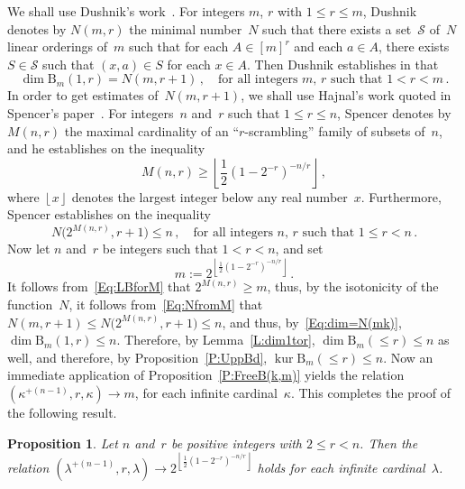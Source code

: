 \documentclass[psamsfonts,reqno]{amsart}
\theoremstyle{plain}
\newtheorem{proposition}[lemma]{Proposition}
\theoremstyle{definition}
\theoremstyle{remark}
\numberwithin{equation}{section}
\numberwithin{figure}{section}
\newcommand{\gk}{\kappa}
\newcommand{\gl}{\lambda}
\newcommand{\les}{\leqslant}
\newcommand{\intgr}[1]{\left\lfloor{#1}\right\rfloor}
\DeclareMathOperator{\kur}{kur}
\newcommand{\cS}{\mathcal{S}}
\newcommand{\rB}{\mathrm{B}}
\begin{document}
We shall use Dushnik's work~\cite{Dush50}. For integers $m$, $r$ with $1\leq r\leq m$, Dushnik denotes by $N(m,r)$ the minimal number~$N$ such that there exists a set~$\cS$ of~$N$ linear orderings of~$m$ such that for each $A\in[m]^r$ and each $a\in A$, there exists $S\in\cS$ such that $(x,a)\in S$ for each $x\in A$. Then Dushnik establishes in \cite[Theorem~III]{Dush50} that
 \begin{equation}\label{Eq:dim=N(mk)}
 \dim\rB_m(1,r)=N(m,r+1)\,,\quad\text{for all integers }m,\,r\text{ such that }
 1<r<m\,.
 \end{equation}
In order to get estimates of~$N(m,r+1)$, we shall use Hajnal's work quoted in Spencer's paper~\cite{Spen71}. For integers~$n$ and~$r$ such that $1\leq r\leq n$, Spencer denotes by $M(n,r)$ the maximal cardinality of an ``$r$-scrambling'' family of subsets of~$n$, and he establishes on \cite[Lemma, p.~351]{Spen71} the inequality
 \begin{equation}\label{Eq:LBforM}
 M(n,r)\geq\intgr{\frac{1}{2}(1-2^{-r})^{-n/r}}\,,
 \end{equation}
where $\intgr{x}$ denotes the largest integer below any real number~$x$. Furthermore, Spencer establishes on \cite[page~351]{Spen71} the inequality
 \begin{equation}\label{Eq:NfromM}
 N\bigl(2^{M(n,r)},r+1\bigr)\leq n\,,\quad\text{for all integers }n,\,r
 \text{ such that }1\leq r<n\,.
 \end{equation}
Now let $n$ and~$r$ be integers such that $1<r<n$, and set
 \begin{equation}\label{Eq:defnEnr}
 m:=2^{\intgr{\frac{1}{2}(1-2^{-r})^{-n/r}}}\,. 
 \end{equation}
It follows from~\eqref{Eq:LBforM} that $2^{M(n,r)}\geq m$, thus, by the isotonicity of the function~$N$, it follows from~\eqref{Eq:NfromM} that $N(m,r+1)\leq N\bigl(2^{M(n,r)},r+1\bigr)\leq n$, and thus, by~\eqref{Eq:dim=N(mk)}, $\dim\rB_m(1,r)\leq n$. Therefore, by Lemma~\ref{L:dim1tor}, $\dim\rB_m({\les}r)\leq n$ as well, and therefore, by Proposition~\ref{P:UppBd}, $\kur\rB_m({\les}r)\leq n$. Now an immediate application of Proposition~\ref{P:FreeB(k,m)} yields the relation $(\gk^{+(n-1)},r,\gk)\rightarrow m$, for each infinite cardinal~$\gk$. This completes the proof of the following result.

\begin{proposition}\label{P:LargeFreeSets}
Let $n$ and~$r$ be positive integers with $2\leq r<n$. Then the relation
$(\gl^{+(n-1)},r,\gl)\rightarrow 2^{\intgr{\frac{1}{2}(1-2^{-r})^{-n/r}}}$ holds for each infinite cardinal~$\gl$.
\end{proposition}
\end{document}

